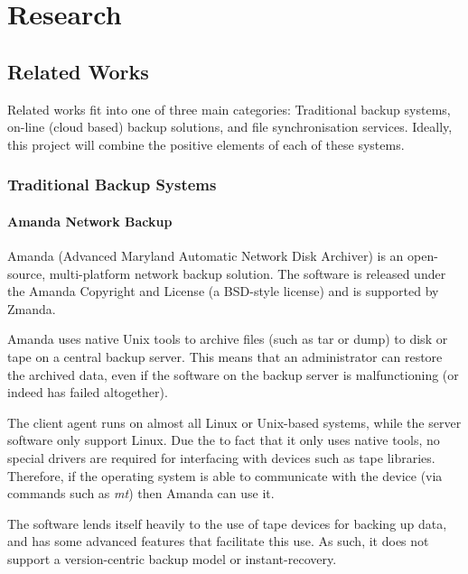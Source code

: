 \chapter{Research}

\begin{bibunit}[plain]

\section{Related Works}

Related works fit into one of three main categories: Traditional backup
systems, on-line (cloud based) backup solutions, and file synchronisation
services. Ideally, this project will combine the positive elements of each of
these systems.

\subsection{Traditional Backup Systems}

\subsubsection{Amanda Network Backup}

Amanda (Advanced Maryland Automatic Network Disk Archiver) is an open-source,
multi-platform network backup solution\cite{AMANDA-about}. The software is
released under the Amanda Copyright and License (a BSD-style license) and is
supported by Zmanda\cite{AMANDA-license}.

Amanda uses native Unix tools to archive files (such as tar or dump) to disk or
tape on a central backup server. This means that an administrator can restore
the archived data, even if the software on the backup server is malfunctioning
(or indeed has failed altogether).

The client agent runs on almost all Linux or Unix-based systems, while the
server software only support Linux. Due the to fact that it only uses native
tools, no special drivers are required for interfacing with devices such as
tape libraries. Therefore, if the operating system is able to communicate with
the device (via commands such as \emph{mt}) then Amanda can use
it\cite{AMANDA-about}.

The software lends itself heavily to the use of tape devices for backing up
data, and has some advanced features that facilitate this use. As such, it does
not support a version-centric backup model or
instant-recovery\cite{AMANDA-about}.


\end{bibunit}
